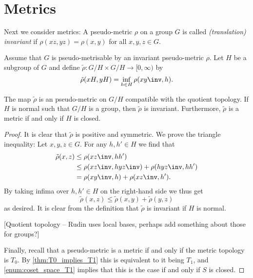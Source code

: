 \documentclass[article, a4paper, 11pt, oneside]{memoir}
\numberwithin{equation}{chapter}
\begin{document}
\section{Metrics}

Next we consider metrics: A pseudo-metric $\rho$ on a group $G$ is called \emph{(translation) invariant} if $\rho(xz,yz) = \rho(x,y)$ for all $x,y,z \in G$.

Assume that $G$ is pseudo-metrisable by an invariant pseudo-metric $\rho$. Let $H$ be a subgroup of $G$ and define $\tilde{\rho} \colon G/H \times G/H \to [0,\infty)$ by
%
\begin{equation*}
    \tilde{\rho}(xH, yH)
        = \inf_{h \in H} \rho(xy\inv, h).
\end{equation*}


\begin{proposition}
    \label{thm:quotient-space-metric}
    The map $\tilde{\rho}$ is an pseudo-metric on $G/H$ compatible with the quotient topology. If $H$ is normal such that $G/H$ is a group, then $\tilde{\rho}$ is invariant. Furthermore, $\tilde{\rho}$ is a metric if and only if $H$ is closed.
\end{proposition}

\begin{proof}
    It is clear that $\tilde{\rho}$ is positive and symmetric. We prove the triangle inequality: Let $x,y,z \in G$. For any $h, h' \in H$ we find that
    \begin{align*}
        \tilde{\rho}(x,z)
            &\leq \rho(xz\inv, hh') \\
            &\leq \rho(xz\inv, hyz\inv) + \rho(hyz\inv, hh') \\
            &= \rho(xy\inv, h) + \rho(xz\inv, h').
    \end{align*}
    By taking infima over $h,h' \in H$ on the right-hand side we thus get
    \begin{equation*}
        \tilde{\rho}(x,z)
            \leq \tilde{\rho}(x,y) + \tilde{\rho}(y,z)
    \end{equation*}
    as desired. It is clear from the definition that $\tilde{\rho}$ is invariant if $H$ is normal.

    [Quotient topology -- Rudin uses local bases, perhaps add something about those for groups?]

    Finally, recall that a pseudo-metric is a metric if and only if the metric topology is $T_0$. By \cref{thm:T0_implies_T1} this is equivalent to it being $T_1$, and \cref{enum:coset_space_T1} implies that this is the case if and only if $S$ is closed.
\end{proof}
\end{document}
